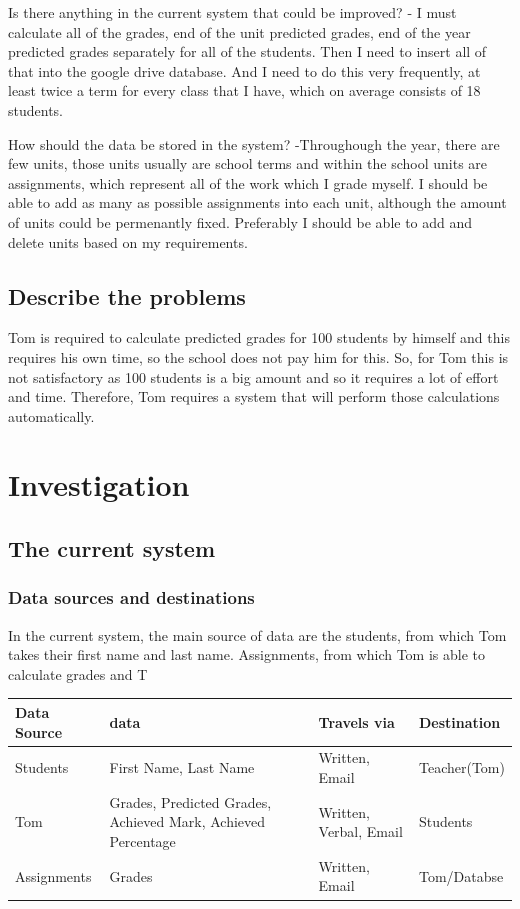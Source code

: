 Is there anything in the current system that could be improved?
- I must calculate all of the grades, end of the unit predicted grades, end of the year predicted grades separately for all of the students. Then I need to insert all of that into the google drive database. And I need to do this very frequently, at least twice a term for every class that I have, which on average consists of 18 students. 

How should the data be stored in the system?
-Throughough the year, there are few units, those units usually are school terms and within the school units are assignments, which represent all of the work which I grade myself. I should be able to add as many as possible assignments into each unit, although the amount of units could be permenantly fixed. Preferably I should be able to add and delete units based on my requirements.

\subsection{Describe the problems}

Tom is required to calculate predicted grades for 100 students by himself and this requires his own time, so the school does not pay him for this. So, for Tom this is not satisfactory as 100 students is a big amount and so it requires a lot of effort and time. Therefore, Tom requires a system that will perform those calculations automatically. 

\section{Investigation}

\subsection{The current system}
\subsubsection{Data sources and destinations}

In the current system, the main source of data are the students, from which Tom 
takes their first name and last name. Assignments, from which Tom is able to calculate grades and T

\begin{center}
    \begin{tabular}{|p{4cm}|p{4cm}|p{4cm}|p{4cm}}
        \hline
        \textbf{Data Source} & \textbf{data} & \textbf{Travels via} &  \textbf{Destination} \\ \hline
Students & First Name, Last Name & Written, Email & Teacher(Tom) \\
\hline
Tom & Grades, Predicted Grades, Achieved Mark, Achieved Percentage & Written, Verbal, Email & Students \\
\hline
Assignments & Grades & Written, Email & Tom/Databse \\ 
\hline
\end{tabular}
\end{center}



